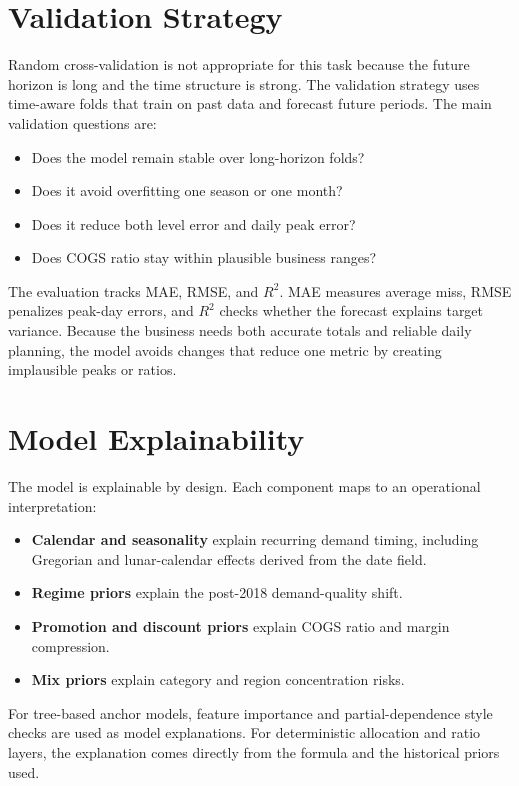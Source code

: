 \documentclass{article}
\begin{document}
\section{Validation Strategy}

Random cross-validation is not appropriate for this task because the future horizon is long and the time structure is strong. The validation strategy uses time-aware folds that train on past data and forecast future periods. The main validation questions are:
\begin{itemize}
  \item Does the model remain stable over long-horizon folds?
  \item Does it avoid overfitting one season or one month?
  \item Does it reduce both level error and daily peak error?
  \item Does COGS ratio stay within plausible business ranges?
\end{itemize}

The evaluation tracks MAE, RMSE, and $R^2$. MAE measures average miss, RMSE penalizes peak-day errors, and $R^2$ checks whether the forecast explains target variance. Because the business needs both accurate totals and reliable daily planning, the model avoids changes that reduce one metric by creating implausible peaks or ratios.

\section{Model Explainability}

The model is explainable by design. Each component maps to an operational interpretation:
\begin{itemize}
  \item \textbf{Calendar and seasonality} explain recurring demand timing, including Gregorian and lunar-calendar effects derived from the date field.
  \item \textbf{Regime priors} explain the post-2018 demand-quality shift.
  \item \textbf{Promotion and discount priors} explain COGS ratio and margin compression.
  \item \textbf{Mix priors} explain category and region concentration risks.
\end{itemize}

For tree-based anchor models, feature importance and partial-dependence style checks are used as model explanations. For deterministic allocation and ratio layers, the explanation comes directly from the formula and the historical priors used.
\end{document}
